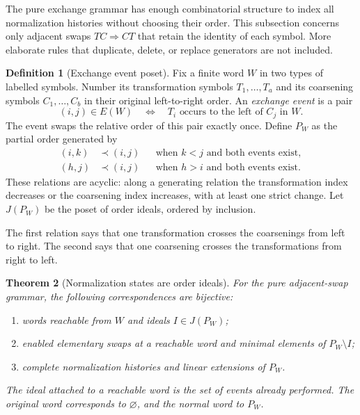 \documentclass[11pt]{article}
\newtheorem{theorem}{Theorem}[section]
\theoremstyle{definition}
\newtheorem{definition}[theorem]{Definition}
\theoremstyle{remark}
\begin{document}
The pure exchange grammar has enough combinatorial structure to index all normalization histories without choosing their order. This subsection concerns only adjacent swaps $TC\Rightarrow CT$ that retain the identity of each symbol. More elaborate rules that duplicate, delete, or replace generators are not included.

\begin{definition}[Exchange event poset]\label{def:event-poset}
Fix a finite word $W$ in two types of labelled symbols. Number its transformation symbols $T_1,\ldots,T_a$ and its coarsening symbols $C_1,\ldots,C_b$ in their original left-to-right order. An \emph{exchange event} is a pair
\[
(i,j)\in E(W)
\quad\Longleftrightarrow\quad
T_i\text{ occurs to the left of }C_j\text{ in }W.
\]
The event swaps the relative order of this pair exactly once. Define $P_W$ as the partial order generated by
\begin{align*}
(i,k)&\prec(i,j) &&\text{when }k<j\text{ and both events exist},\\
(h,j)&\prec(i,j) &&\text{when }h>i\text{ and both events exist}.
\end{align*}
These relations are acyclic: along a generating relation the transformation index decreases or the coarsening index increases, with at least one strict change. Let $J(P_W)$ be the poset of order ideals, ordered by inclusion.
\end{definition}

The first relation says that one transformation crosses the coarsenings from left to right. The second says that one coarsening crosses the transformations from right to left.

\begin{theorem}[Normalization states are order ideals]\label{thm:event-ideals}
For the pure adjacent-swap grammar, the following correspondences are bijective:
\begin{enumerate}
\item words reachable from $W$ and ideals $I\in J(P_W)$;
\item enabled elementary swaps at a reachable word and minimal elements of $P_W\setminus I$;
\item complete normalization histories and linear extensions of $P_W$.
\end{enumerate}
The ideal attached to a reachable word is the set of events already performed. The original word corresponds to $\varnothing$, and the normal word to $P_W$.
\end{theorem}
\end{document}
